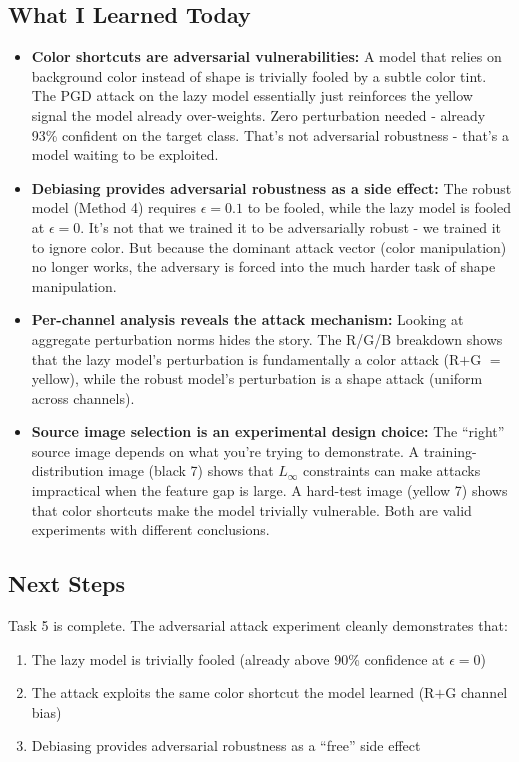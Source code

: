 \documentclass[9pt,a4paper,twocolumn,twoside]{tau-class/tau}
\begin{document}
    \subsection{What I Learned Today}

        \begin{itemize}
            \item \textbf{Color shortcuts are adversarial vulnerabilities:} A model that relies on background color instead of shape is trivially fooled by a subtle color tint. The PGD attack on the lazy model essentially just reinforces the yellow signal the model already over-weights. Zero perturbation needed - already 93\% confident on the target class. That's not adversarial robustness - that's a model waiting to be exploited.

            \item \textbf{Debiasing provides adversarial robustness as a side effect:} The robust model (Method 4) requires $\epsilon = 0.1$ to be fooled, while the lazy model is fooled at $\epsilon = 0$. It's not that we trained it to be adversarially robust - we trained it to ignore color. But because the dominant attack vector (color manipulation) no longer works, the adversary is forced into the much harder task of shape manipulation.

            \item \textbf{Per-channel analysis reveals the attack mechanism:} Looking at aggregate perturbation norms hides the story. The R/G/B breakdown shows that the lazy model's perturbation is fundamentally a color attack (R$+$G $=$ yellow), while the robust model's perturbation is a shape attack (uniform across channels).

            \item \textbf{Source image selection is an experimental design choice:} The ``right'' source image depends on what you're trying to demonstrate. A training-distribution image (black 7) shows that $L_\infty$ constraints can make attacks impractical when the feature gap is large. A hard-test image (yellow 7) shows that color shortcuts make the model trivially vulnerable. Both are valid experiments with different conclusions.
        \end{itemize}

    \subsection{Next Steps}

        Task 5 is complete. The adversarial attack experiment cleanly demonstrates that:
        \begin{enumerate}
            \item The lazy model is trivially fooled (already above 90\% confidence at $\epsilon = 0$)
            \item The attack exploits the same color shortcut the model learned (R$+$G channel bias)
            \item Debiasing provides adversarial robustness as a ``free'' side effect
        \end{enumerate}
\end{document}
